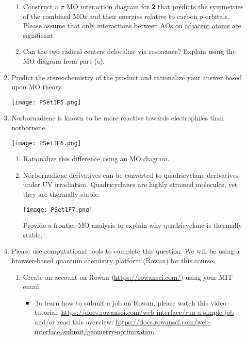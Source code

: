 \documentclass[../psets.tex]{subfiles}
\begin{document}
\begin{enumerate}
\begin{enumerate}
        \item Construct a $\pi$ MO interaction diagram for \textbf{2} that predicts the symmetries of the combined MOs and their energies relative to carbon $p$-orbitals. Please assume that only interactions between AOs on \underline{adjacent atoms} are significant.
        \item Can the two radical centers delocalize via resonance? Explain using the MO diagram from part (a).
    \end{enumerate}
    \item Predict the stereochemistry of the product and rationalize your answer based upon MO theory.
    \begin{center}
        \texttt{[image: PSet1F5.png]}
    \end{center}
    \item Norbornadiene is known to be more reactive towards electrophiles than norbornene.
    \begin{center}
        \texttt{[image: PSet1F6.png]}
    \end{center}
    \begin{enumerate}
        \item Rationalize this difference using an MO diagram.
        \item Norbornadiene derivatives can be converted to quadricyclane derivatives under UV irradiation. Quadricyclanes are highly strained molecules, yet they are thermally stable.
        \begin{center}
            \texttt{[image: PSet1F7.png]}
        \end{center}
        Provide a frontier MO analysis to explain why quadricyclane is thermally stable.
    \end{enumerate}
    \item Please use computational tools to complete this question. We will be using a browser-based quantum chemistry platform (\href{https://rowansci.com/}{Rowan}) for this course.
    \begin{enumerate}
        \item Create an account on Rowan (\url{https://rowansci.com/}) using your MIT email.
        \begin{itemize}
            \item To learn how to submit a job on Rowan, please watch this video tutorial: \url{https://docs.rowansci.com/web-interface/run-a-simple-job} and/or read this overview: \url{https://docs.rowansci.com/web-interface/submit/geometry-optimization}.

\end{itemize}
\end{enumerate}
\end{enumerate}
\end{document}
